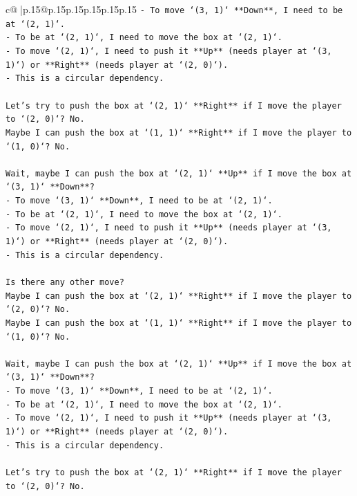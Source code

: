 \documentclass{article}
\begin{document}
{\begin{supertabular}{c@{$\;$}|p{.15\linewidth}@{}p{.15\linewidth}p{.15\linewidth}p{.15\linewidth}p{.15\linewidth}p{.15\linewidth}}
{{{\texttt{{-} To move `(3, 1)` **Down**, I need to be at `(2, 1)`.} \\
\texttt{{-} To be at `(2, 1)`, I need to move the box at `(2, 1)`.} \\
\texttt{{-} To move `(2, 1)`, I need to push it **Up** (needs player at `(3, 1)`) or **Right** (needs player at `(2, 0)`).} \\
\texttt{{-} This is a circular dependency.} \\
\\ 
\texttt{Let's try to push the box at `(2, 1)` **Right** if I move the player to `(2, 0)`? No.} \\
\texttt{Maybe I can push the box at `(1, 1)` **Right** if I move the player to `(1, 0)`? No.} \\
\\ 
\texttt{Wait, maybe I can push the box at `(2, 1)` **Up** if I move the box at `(3, 1)` **Down**?} \\
\texttt{{-} To move `(3, 1)` **Down**, I need to be at `(2, 1)`.} \\
\texttt{{-} To be at `(2, 1)`, I need to move the box at `(2, 1)`.} \\
\texttt{{-} To move `(2, 1)`, I need to push it **Up** (needs player at `(3, 1)`) or **Right** (needs player at `(2, 0)`).} \\
\texttt{{-} This is a circular dependency.} \\
\\ 
\texttt{Is there any other move?} \\
\texttt{Maybe I can push the box at `(2, 1)` **Right** if I move the player to `(2, 0)`? No.} \\
\texttt{Maybe I can push the box at `(1, 1)` **Right** if I move the player to `(1, 0)`? No.} \\
\\ 
\texttt{Wait, maybe I can push the box at `(2, 1)` **Up** if I move the box at `(3, 1)` **Down**?} \\
\texttt{{-} To move `(3, 1)` **Down**, I need to be at `(2, 1)`.} \\
\texttt{{-} To be at `(2, 1)`, I need to move the box at `(2, 1)`.} \\
\texttt{{-} To move `(2, 1)`, I need to push it **Up** (needs player at `(3, 1)`) or **Right** (needs player at `(2, 0)`).} \\
\texttt{{-} This is a circular dependency.} \\
\\ 
\texttt{Let's try to push the box at `(2, 1)` **Right** if I move the player to `(2, 0)`? No.} \\
}}}
\end{supertabular}}
\end{document}
